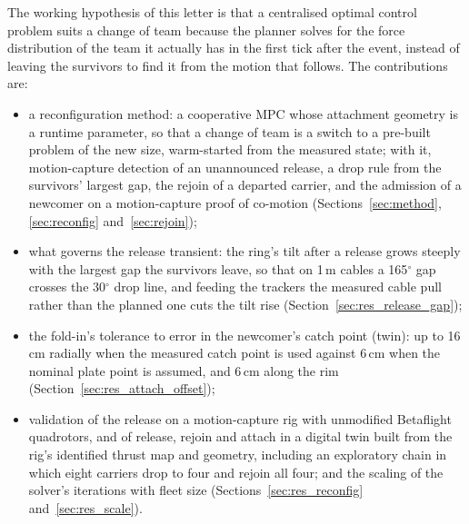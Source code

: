 The working hypothesis of this letter is that a centralised optimal control problem suits a change of team because
the planner solves for the force distribution of the team it actually has in the first tick after the event,
instead of leaving the survivors to find it from the motion that follows. The contributions are:
\begin{itemize}
  \item a reconfiguration method: a cooperative MPC whose attachment geometry is a runtime parameter, so that a
  change of team is a switch to a pre-built problem of the new size, warm-started from the measured state; with it,
  motion-capture detection of an unannounced release, a drop rule from the survivors' largest gap, the rejoin of a
  departed carrier, and the admission of a newcomer on a motion-capture proof of co-motion
  (Sections~\ref{sec:method}, \ref{sec:reconfig} and~\ref{sec:rejoin});
  \item what governs the release transient: the ring's tilt after a release grows steeply with the largest gap the
  survivors leave, so that on 1\,m cables a 165$^\circ$ gap crosses the 30$^\circ$ drop line, and feeding the
  trackers the measured cable pull rather than the planned one cuts the tilt rise (Section~\ref{sec:res_release_gap});
  \item the fold-in's tolerance to error in the newcomer's catch point (twin): up to 16\,cm radially when the
  measured catch point is used against 6\,cm when the nominal plate point is assumed, and 6\,cm along the rim (Section~\ref{sec:res_attach_offset});
  \item validation of the release on a motion-capture rig with unmodified Betaflight quadrotors, and of release,
  rejoin and attach in a digital twin built from the rig's identified thrust map and geometry, including an
  exploratory chain in which eight carriers drop to four and rejoin all four; and the scaling of the solver's
  iterations with fleet size
  (Sections~\ref{sec:res_reconfig} and~\ref{sec:res_scale}).
\end{itemize}
